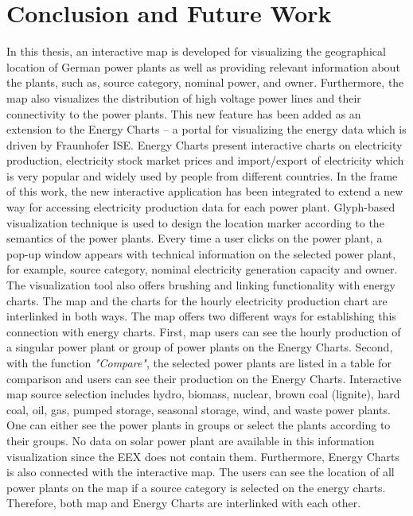 \chapter{Conclusion and Future Work}
\label{chap:conclusion}

In this thesis, an interactive map is developed for visualizing the geographical location of German power plants as well as providing relevant information about the plants, such as, source category, nominal power, and owner. Furthermore, the map also visualizes the distribution of high voltage power lines and their connectivity to the power plants. This new feature has been added as an extension to the Energy Charts – a portal for visualizing the energy data which is driven by Fraunhofer ISE. Energy Charts present interactive charts on electricity production, electricity stock market prices and import/export of electricity which is very popular and widely used by people from different countries. In the frame of this work, the new interactive application has been integrated to extend a new way for accessing electricity production data for each power plant. Glyph-based visualization technique is used to design the location marker according to the semantics of the power plants. Every time a user clicks on the power plant, a pop-up window appears with technical information on the selected power plant, for example, source category, nominal electricity generation capacity and owner. The visualization tool also offers brushing and linking functionality with energy charts. The map and the charts for the hourly electricity production chart are interlinked in both ways. The map offers two different ways for establishing this connection with energy charts. First, map users can see the hourly production of a singular power plant or group of power plants on the Energy Charts. Second, with the function \textit{"Compare"}, the selected power plants are listed in a table for comparison and users can see their production on the Energy Charts. Interactive map source selection includes hydro, biomass, nuclear, brown coal (lignite), hard coal, oil, gas, pumped storage, seasonal storage, wind, and waste power plants. One can either see the power plants in groups or select the plants according to their groups. No data on solar power plant are available in this information visualization since the EEX does not contain them. Furthermore, Energy Charts is also connected with the interactive map. The users can see the location of all power plants on the map if a source category is selected on the energy charts. Therefore, both map and Energy Charts are interlinked with each other.  

